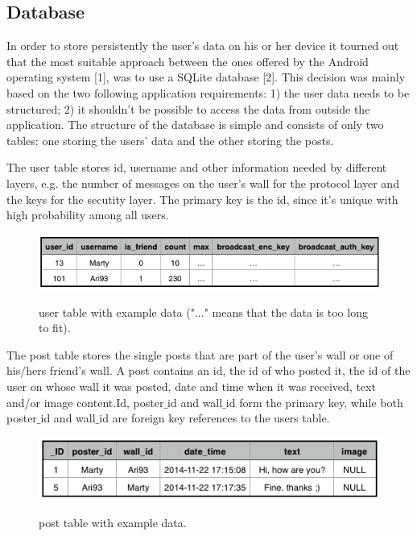\documentclass{report}
\newcommand{\lfig}[1]{\label{fig:#1}}
\begin{document}
\subsection{Database}
In order to store persistently the user's data on his or her device it tourned out that the most suitable approach between the ones offered by the Android operating system [1], was to use a SQLite database [2]. This decision was mainly based on the two following application requirements:
1) the user data needs to be structured;
2) it shouldn't be possible to access the data from outside the application.
The structure of the database is simple and consists of only two tables: one storing the users' data and the other storing the posts.

The user table stores id, username and other information needed by different layers, e.g. the number of messages on the user's wall for the protocol layer and the keys for the secutity layer. The primary key is the id, since it's unique with high probability among all users.

\begin{figure}[H]
	\centering
    \includegraphics[width=\columnwidth]{users_table_example.png}
    \lfig{users_table_example}
    \vspace{-5mm} %
	\caption{user table with example data ("..." means that the data is too long to fit).}
\end{figure}

The post table stores the single posts that are part of the user's wall or one of his/hers friend's wall. 
A post contains an id, the id of who posted it, the id of the user on whose wall it was posted, date and time when it was received, text and/or image content.Id, poster$\_$id and wall$\_$id form the primary key, while both poster$\_$id and wall$\_$id are foreign key references to the users table.

\begin{figure}[H]
	\centering
    \includegraphics[width=\columnwidth]{post_table_example.png}
    \lfig{post_table_example}
    \vspace{-5mm} %
	\caption{post table with example data.}
\end{figure}
\end{document}
